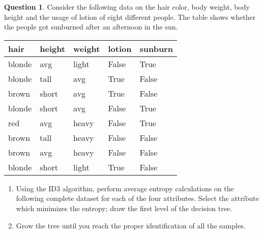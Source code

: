 \documentclass[11pt,a4paper]{article}
\theoremstyle{definition}%
\newtheorem{Q}{Question}[] %
\begin{document}
\begin{Q}
Consider the following data on the hair color, body weight, body height and the usage of lotion of
eight different people. The table shows whether the people got sunburned after an afternoon in the
sun.
\begin{center}
\begin{tabular}{|l|l|l|l|l|}
\hline
\textbf{hair} & \textbf{height} & \textbf{weight} & \textbf{lotion} & \textbf{sunburn} \\ \hline
blonde        & avg             & light           & False           & True             \\ \hline
blonde        & tall            & avg             & True            & False            \\ \hline
brown         & short           & avg             & True            & False            \\ \hline
blonde        & short           & avg             & False           & True             \\ \hline
red           & avg             & heavy           & False           & True             \\ \hline
brown         & tall            & heavy           & False           & False            \\ \hline
brown         & avg             & heavy           & False           & False            \\ \hline
blonde        & short           & light           & True            & False            \\ \hline
\end{tabular}
\end{center}

\begin{enumerate}
    \item Using the ID3 algorithm, perform average entropy calculations on the following complete 
        dataset for each of the four attributes. Select the attribute which minimizes the entropy;
        draw the first level of the decision tree.
    \item Grow the tree until you reach the proper identification of all the samples.
    \end{enumerate}
\end{Q}
\end{document}
